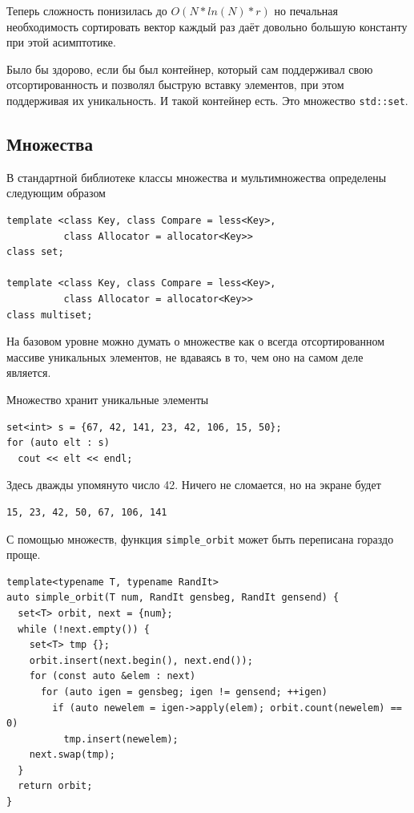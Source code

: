 \documentclass[a4paper,12pt,oneside]{book}
\begin{document}
Теперь сложность понизилась до $O(N*ln(N)*r)$ но печальная необходимость сортировать вектор каждый раз даёт довольно большую константу при этой асимптотике.

Было бы здорово, если бы был контейнер, который сам поддерживал свою отсортированность и позволял быструю вставку элементов, при этом поддерживая их уникальность. И такой контейнер есть. Это множество \lstinline!std::set!.

\subsection{Множества}

В стандартной библиотеке классы множества и мультимножества
определены следующим образом

\begin{lstlisting}
template <class Key, class Compare = less<Key>,
          class Allocator = allocator<Key>>
class set;

template <class Key, class Compare = less<Key>,
          class Allocator = allocator<Key>>
class multiset;
\end{lstlisting}

На базовом уровне можно думать о множестве как о всегда отсортированном массиве уникальных элементов, не вдаваясь в то, чем оно на самом деле является.

Множество хранит уникальные элементы

\begin{lstlisting}
set<int> s = {67, 42, 141, 23, 42, 106, 15, 50};
for (auto elt : s)
  cout << elt << endl;
\end{lstlisting}

Здесь дважды упомянуто число 42. Ничего не сломается, но на экране будет

\begin{verbatim}
15, 23, 42, 50, 67, 106, 141
\end{verbatim}

С помощью множеств, функция \lstinline!simple_orbit! может быть переписана гораздо проще.

\begin{lstlisting}
template<typename T, typename RandIt>
auto simple_orbit(T num, RandIt gensbeg, RandIt gensend) {
  set<T> orbit, next = {num};
  while (!next.empty()) {
    set<T> tmp {};
    orbit.insert(next.begin(), next.end());
    for (const auto &elem : next)
      for (auto igen = gensbeg; igen != gensend; ++igen)
        if (auto newelem = igen->apply(elem); orbit.count(newelem) == 0)
          tmp.insert(newelem);        
    next.swap(tmp);
  }
  return orbit;
}
\end{lstlisting}
\end{document}
